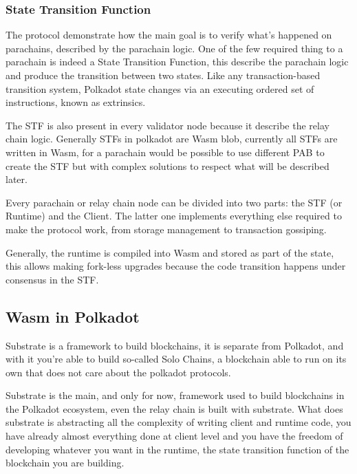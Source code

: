 \documentclass[../main.tex]{subfiles}
\begin{document}
\subsubsection{State Transition Function}

The protocol demonstrate how the main goal is to verify what's happened on parachains, described by the parachain logic. One of the few required thing to a parachain is indeed a State Transition Function, this describe the parachain logic and produce the transition between two states. Like any transaction-based transition system, Polkadot state changes via an executing ordered set of instructions, known as extrinsics.~\cite{burdges2020overview}


The STF is also present in every validator node because it describe the relay chain logic. Generally STFs in polkadot are Wasm blob, currently all STFs are written in Wasm, for a parachain would be possible to use different PAB to create the STF but with complex solutions to respect what will be described later.

Every parachain or relay chain node can be divided into two parts: the STF (or Runtime) and the Client. The latter one implements everything else required to make the protocol work, from storage management to transaction gossiping.

Generally, the runtime is compiled into Wasm and stored as part of the state, this allows making fork-less upgrades because the code transition happens under consensus in the STF.


\subsection{Wasm in Polkadot}

Substrate is a framework to build blockchains, it is separate from Polkadot, and with it you're able to build so-called Solo Chains, a blockchain able to run on its own that does not care about the polkadot protocols.

Substrate is the main, and only for now, framework used to build blockchains in the Polkadot ecosystem, even the relay chain is built with substrate. What does substrate is abstracting all the complexity of writing client and runtime code, you have already almost everything done at client level and you have the freedom of developing whatever you want in the runtime, the state transition function of the blockchain you are building.
\end{document}

